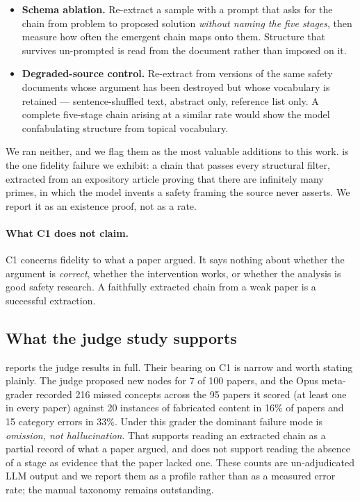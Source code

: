 \documentclass[10pt,twocolumn,letterpaper]{article}
\begin{document}
\begin{itemize}
\setlength{\itemsep}{1pt}
\item \textbf{Schema ablation.} Re-extract a sample with a prompt that asks for
the chain from problem to proposed solution \emph{without naming the five
stages}, then measure how often the emergent chain maps onto them. Structure that
survives un-prompted is read from the document rather than imposed on it.
\item \textbf{Degraded-source control.} Re-extract from versions of the same
safety documents whose argument has been destroyed but whose vocabulary is
retained --- sentence-shuffled text, abstract only, reference list only. A
complete five-stage chain arising at a similar rate would show the model
confabulating structure from topical vocabulary.
\end{itemize}

We ran neither, and we flag them as the most valuable additions to this work.
 is the one fidelity failure we exhibit: a chain that passes
every structural filter, extracted from an expository article proving that there
are infinitely many primes, in which the model invents a safety framing the
source never asserts. We report it as an existence proof, not as a rate.

\paragraph{What C1 does not claim.} C1 concerns fidelity to what a paper argued.
It says nothing about whether the argument is \emph{correct}, whether the
intervention works, or whether the analysis is good safety research. A faithfully
extracted chain from a weak paper is a successful extraction.

\subsection{What the judge study supports}

 reports the judge results in full. Their bearing on C1 is
narrow and worth stating plainly. The judge proposed new nodes for 7 of 100
papers, and the Opus meta-grader recorded 216 missed concepts across the 95
papers it scored (at least one in every paper) against 20 instances of fabricated
content in 16\% of papers and 15 category errors in 33\%.
Under this grader the dominant failure mode is \emph{omission, not
hallucination}. That supports reading an extracted chain as a partial record of
what a paper argued, and does not support reading the absence of a stage as
evidence that the paper lacked one. These counts are un-adjudicated LLM output
and we report them as a profile rather than as a measured error rate; the manual
taxonomy remains outstanding.
\end{document}
